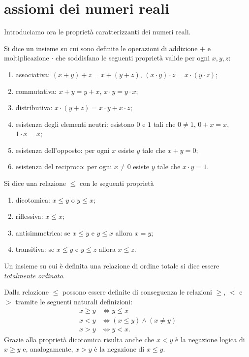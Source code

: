 \section{assiomi dei numeri reali}

Introduciamo ora le proprietà caratterizzanti dei numeri reali.

\begin{definition}[campo]\label{def:field}
\label{def:campo}%
Si dice 
un insieme su cui sono definite le operazioni di addizione $+$ e
moltiplicazione $\cdot$ che soddisfano le seguenti proprietà
valide per ogni $x,y,z$:
\begin{enumerate}
\item associativa: $(x+y)+z = x + (y+z)$, $(x\cdot y)\cdot z = x \cdot (y \cdot z)$;
\item commutativa: $x+y=y+x$, $x\cdot y = y \cdot x$;
\item distributiva: $x\cdot (y+z) = x\cdot y + x \cdot z$;
\item esistenza degli elementi neutri: esistono $0$ e $1$
tali che $0\neq 1$, $0+x = x$, $1\cdot x = x$;
\item esistenza dell'opposto: per ogni $x$ esiste $y$ tale che $x+y = 0$;
\item esistenza del reciproco: per ogni $x\neq 0$ esiste $y$ tale che $x \cdot y = 1$.
\end{enumerate}
\end{definition}

\begin{definition}
\label{def:order}
Si dice 
una relazione $\le$ con le seguenti proprietà
\mymargin{$\le$}
\begin{enumerate}
\item dicotomica: $x \le y$ o $y \le x$;
\item riflessiva: $x \le x$;
\item antisimmetrica: se $ x\le y$ e $y \le x$ allora $x=y$;
\item transitiva: se $x\le y $ e $ y \le z$ allora $x\le z$.
\end{enumerate}
Un insieme su cui è definita una relazione di
ordine totale si dice essere \emph{totalmente ordinato}.
\end{definition}

Dalla relazione $\le$ possono essere definite di conseguenza
le relazioni $\ge$, $<$ e $>$ tramite le seguenti naturali definizioni:
\mymargin{$\ge$ $<$ $>$}%
\begin{align*}
  x \ge y &\iff y \le x \\
  x < y & \iff (x\le y) \land (x \neq y)\\
  x > y & \iff y< x.
\end{align*}
Grazie alla proprietà dicotomica risulta anche che
$x<y$ è la negazione logica di $x \ge y$ e, analogamente,
$x>y$ è la negazione di $x \le y$.

